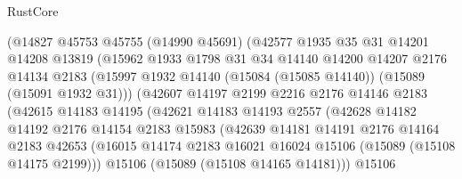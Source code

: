 \begin{lexlean}{RustCore}
\begin{coremodule}
                      (@14827
                        @45753
                        @45755
                        (@14990 @45691)
                        (@42577
                          @1935
                          @35
                          @31
                          @14201
                          @14208
                          @13819
                          (@15962
                            @1933
                            @1798
                            @31
                            @34
                            @14140
                            @14200
                            @14207
                            @2176
                            @14134
                            @2183
                            (@15997
                              @1932
                              @14140
                              (@15084 (@15085 @14140))
                              (@15089 (@15091 @1932 @31)))
                            (@42607
                              @14197
                              @2199
                              @2216
                              @2176
                              @14146
                              @2183
                              (@42615
                                @14183
                                @14195
                                (@42621
                                  @14183
                                  @14193
                                  @2557
                                  (@42628
                                    @14182
                                    @14192
                                    @2176
                                    @14154
                                    @2183
                                    @15983
                                    (@42639
                                      @14181
                                      @14191
                                      @2176
                                      @14164
                                      @2183
                                      @42653
                                      (@16015
                                        @14174
                                        @2183
                                        @16021
                                        @16024
                                        @15106
                                        (@15089 (@15108 @14175 @2199)))
                                      @15106
                                      (@15089 (@15108 @14165 @14181)))
                                    @15106

\end{coremodule}
\end{lexlean}
